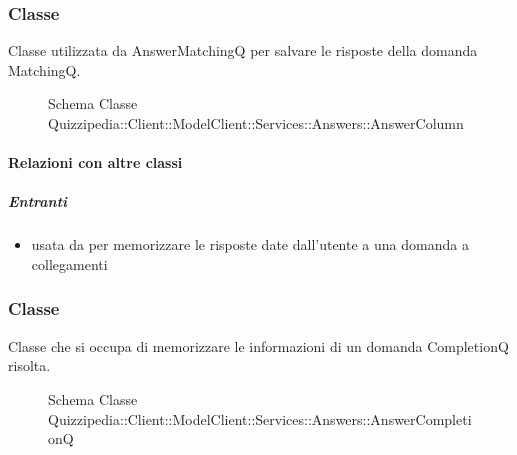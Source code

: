 \subsubsection{Classe }
Classe utilizzata da AnswerMatchingQ per salvare le risposte della domanda MatchingQ.
\begin{figure}[H]
\centering
\noindent{}
\caption[Schema Classe AnswerColumn]{Schema Classe Quizzipedia::Client::ModelClient::Services::Answers::AnswerColumn}
\end{figure}
\paragraph{Relazioni con altre classi}
\subparagraph{Entranti}
\begin{itemize}
\item usata da  per memorizzare le risposte date dall'utente a una domanda a collegamenti
\end{itemize}
\subsubsection{Classe }
Classe che si occupa di memorizzare le informazioni di un domanda CompletionQ risolta.
\begin{figure}[H]
\centering
\noindent{}
\caption[Schema Classe AnswerCompletionQ]{Schema Classe Quizzipedia::Client::ModelClient::Services::Answers::AnswerCompletionQ}
\end{figure}
